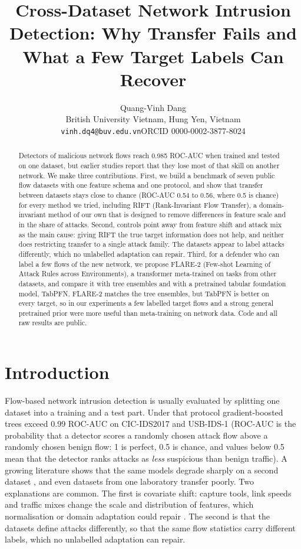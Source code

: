 \documentclass[11pt]{article}
\title{Cross-Dataset Network Intrusion Detection: Why Transfer Fails and What a Few Target Labels Can Recover}
\author{Quang-Vinh Dang\\
British University Vietnam, Hung Yen, Vietnam\\
\texttt{vinh.dq4@buv.edu.vn}\quad ORCID 0000-0002-3877-8024}
\date{}
\begin{document}
\maketitle

\begin{abstract}
Detectors of malicious network flows reach 0.985 ROC-AUC when trained and tested on one dataset, but earlier studies report that they lose most of that skill on another network.
We make three contributions.
First, we build a benchmark of seven public flow datasets with one feature schema and one protocol, and show that transfer between datasets stays close to chance (ROC-AUC 0.54 to 0.56, where 0.5 is chance) for every method we tried, including RIFT (Rank-Invariant Flow Transfer), a domain-invariant method of our own that is designed to remove differences in feature scale and in the share of attacks.
Second, controls point away from feature shift and attack mix as the main cause: giving RIFT the true target information does not help, and neither does restricting transfer to a single attack family.
The datasets appear to label attacks differently, which no unlabelled adaptation can repair.
Third, for a defender who can label a few flows of the new network, we propose FLARE-2 (Few-shot Learning of Attack Rules across Environments), a transformer meta-trained on tasks from other datasets, and compare it with tree ensembles and with a pretrained tabular foundation model, TabPFN.
FLARE-2 matches the tree ensembles, but TabPFN is better on every target, so in our experiments a few labelled target flows and a strong general pretrained prior were more useful than meta-training on network data.
Code and all raw results are public.
\end{abstract}

\section{Introduction}
Flow-based network intrusion detection is usually evaluated by splitting one dataset into a training and a test part.
Under that protocol gradient-boosted trees exceed 0.99 ROC-AUC on CIC-IDS2017 and USB-IDS-1 (ROC-AUC is the probability that a detector scores a randomly chosen attack flow above a randomly chosen benign flow: 1 is perfect, 0.5 is chance, and values below 0.5 mean that the detector ranks attacks as \emph{less} suspicious than benign traffic).
A growing literature shows that the same models degrade sharply on a second dataset \citep{layeghy2023explainable,cantone2024crossdataset,dhooge2020inter,dhooge2023damaged,apruzzese2022cross}, and even datasets from one laboratory transfer poorly.
Two explanations are common.
The first is covariate shift: capture tools, link speeds and traffic mixes change the scale and distribution of features, which normalisation or domain adaptation could repair \citep{ganin2016dann,sun2016coral,layeghy2023dinids}.
The second is that the datasets define attacks differently, so that the same flow statistics carry different labels, which no unlabelled adaptation can repair.
\end{document}
